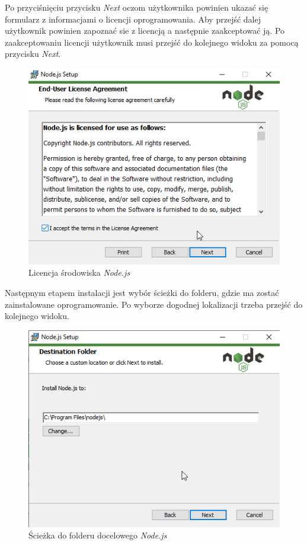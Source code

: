 \documentclass[a4paper,twoside,12pt]{book}
\begin{document}
Po przyciśnięciu przycisku \textit{Next} oczom użytkownika powinien ukazać się formularz z informacjami o licencji oprogramowania. Aby przejść dalej użytkownik powinien zapoznać sie z licencją a następnie zaakceptować ją. Po zaakceptowaniu licencji użytkownik musi przejść do kolejnego widoku za pomocą przycisku \textit{Next}.
\begin{figure}[h!]
	\centering
	\includegraphics[width=0.65\linewidth]{../zrzuty_ekranu/instalacja_nodejs/node2}
	\caption{Licencja środowiska \textit{Node.js}}
	\label{fig:node2}
\end{figure}
\FloatBarrier

\newpage
Następnym etapem instalacji jest wybór ścieżki do folderu, gdzie ma zostać zainstalowane oprogramowanie. Po wyborze dogodnej lokalizacji trzeba przejść do kolejnego widoku.
\begin{figure}[h!]
	\centering
	\includegraphics[width=0.6\linewidth]{../zrzuty_ekranu/instalacja_nodejs/node3}
	\caption{Ścieżka do folderu docelowego \textit{Node.js}}
	\label{fig:node3}
\end{figure}
\end{document}
